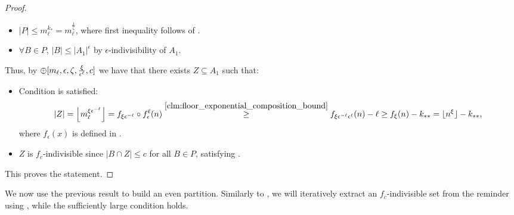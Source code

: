 \begin{lemma}
\begin{proof}
\begin{itemize}
                    \item $|P| \leq m_\ell^{k_*} = m_\ell^{\frac{1}{\zeta}}$, where first inequality follows 
                        of .
                    \item $\forall B \in P$, $|B| \leq |A_1|^\epsilon$ by $\epsilon$-indivisibility of $A_1$.
                \end{itemize}
                Thus, by $\oplus[ m_\ell, \epsilon, \zeta, \frac{\xi}{\epsilon^\ell}, c ]$ we have that there exists $Z \subseteq A_1$ such that:
                \begin{itemize}
                    \item Condition  is satisfied:
                        \[
                            |Z| = \left\lfloor m_\ell^{\xi\epsilon^{-\ell}} \right\rfloor
                            = f_{\xi\epsilon^{-\ell}} \circ f_{\epsilon}^{\ell} (n)
                            \stackrel{\ref{clm:floor_exponential_composition_bound}}{\geq} f_{\xi\epsilon^{-\ell} \epsilon^{\ell}} (n) - \ell
                            \geq f_\xi (n) - k_{**}
                            = \lfloor n^\xi \rfloor - k_{**},
                        \]
                        where $f_\epsilon(x)$ is defined in .
                    \item $Z$ is $f_c$-indivisible since $|B \cap Z| \leq c$ for all $B \in P$,
                        satisfying .
                \end{itemize}
                This proves the statement.
            \end{proof}
        \end{lemma}

        We now use the previous result to build an even partition.
        Similarly to , we will iteratively extract an $f_c$-indivisible
        set from the reminder using , while
        the sufficiently large condition holds.

